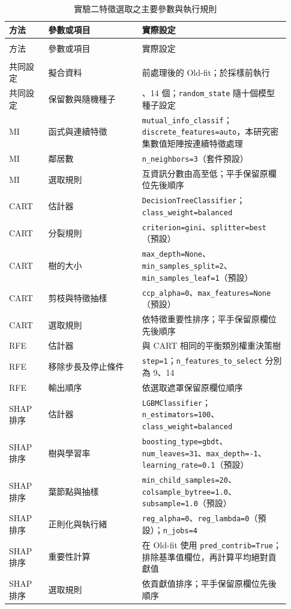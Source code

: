 \begingroup
\footnotesize{}\setlength{\tabcolsep}{3pt}
\begin{longtable}{@{}>{\raggedright\arraybackslash}p{0.13\linewidth}>{\raggedright\arraybackslash}p{0.31\linewidth}>{\raggedright\arraybackslash}p{0.49\linewidth}@{}}
\caption{實驗二特徵選取之主要參數與執行規則}\label{tab:method-fs-parameters}\\
\toprule
方法 & 參數或項目 & 實際設定 \\
\midrule\endfirsthead
\multicolumn{3}{c}{表~\thetable（續）}\\\toprule
方法 & 參數或項目 & 實際設定 \\
\midrule\endhead
\midrule\multicolumn{3}{r}{續下頁}\\\endfoot
\bottomrule\endlastfoot
共同設定 & 擬合資料 & 前處理後的 Old-fit；於採樣前執行 \\
共同設定 & 保留數與隨機種子 & 9、14 個；\nolinkurl{random_state} 隨十個模型種子設定 \\
MI & 函式與連續特徵 & \nolinkurl{mutual_info_classif}；\nolinkurl{discrete_features=auto}，本研究密集數值矩陣按連續特徵處理 \\
MI & 鄰居數 & \nolinkurl{n_neighbors=3}（套件預設） \\
MI & 選取規則 & 互資訊分數由高至低；平手保留原欄位先後順序 \\
CART & 估計器 & \nolinkurl{DecisionTreeClassifier}；\nolinkurl{class_weight=balanced} \\
CART & 分裂規則 & \nolinkurl{criterion=gini}、\nolinkurl{splitter=best}（預設） \\
CART & 樹的大小 & \nolinkurl{max_depth=None}、\nolinkurl{min_samples_split=2}、\nolinkurl{min_samples_leaf=1}（預設） \\
CART & 剪枝與特徵抽樣 & \nolinkurl{ccp_alpha=0}、\nolinkurl{max_features=None}（預設） \\
CART & 選取規則 & 依特徵重要性排序；平手保留原欄位先後順序 \\
RFE & 估計器 & 與 CART 相同的平衡類別權重決策樹 \\
RFE & 移除步長及停止條件 & \nolinkurl{step=1}；\nolinkurl{n_features_to_select} 分別為 9、14 \\
RFE & 輸出順序 & 依選取遮罩保留原欄位順序 \\
SHAP 排序 & 估計器 & \nolinkurl{LGBMClassifier}；\nolinkurl{n_estimators=100}、\nolinkurl{class_weight=balanced} \\
SHAP 排序 & 樹與學習率 & \nolinkurl{boosting_type=gbdt}、\nolinkurl{num_leaves=31}、\nolinkurl{max_depth=-1}、\nolinkurl{learning_rate=0.1}（預設） \\
SHAP 排序 & 葉節點與抽樣 & \nolinkurl{min_child_samples=20}、\nolinkurl{colsample_bytree=1.0}、\nolinkurl{subsample=1.0}（預設） \\
SHAP 排序 & 正則化與執行緒 & \nolinkurl{reg_alpha=0}、\nolinkurl{reg_lambda=0}（預設）；\nolinkurl{n_jobs=4} \\
SHAP 排序 & 重要性計算 & 在 Old-fit 使用 \nolinkurl{pred_contrib=True}；排除基準值欄位，再計算平均絕對貢獻值 \\
SHAP 排序 & 選取規則 & 依貢獻值排序；平手保留原欄位先後順序 \\
\end{longtable}
